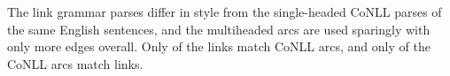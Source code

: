 \documentclass[a4paper,11pt]{article}
\newcommand{\Note}[4][]{\todo[author=#2,color=#3,fancyline,#1]{#4}}
\newcommand{\noteJE}[2][]{\Note[#1]{JE}{green!40}{#2}}
\newcommand{\NoteJE}[2][]{\noteJE[inline,#1]{#2}}
\begin{document}
The link grammar parses differ in style from the single-headed CoNLL parses of the same English sentences, and the multiheaded arcs are used sparingly with only more edges overall.  Only of the links match CoNLL arcs, and only of the CoNLL arcs match links.
%   
% 







%  
\end{document}
